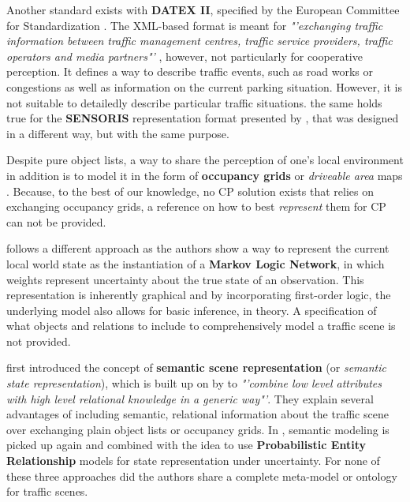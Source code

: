 Another standard exists with \textbf{DATEX II}, specified by the European Committee for Standardization \cite{Dolger2011}. The XML-based format is meant for \textit{"'exchanging traffic information between traffic management centres, traffic service providers, traffic operators and media partners"'} \cite{wiki:datex2}, however, not particularly for cooperative perception. It defines a way to describe traffic events, such as road works or congestions as well as information on the current parking situation. However, it is not suitable to detailedly describe particular traffic situations. the same holds true for the \textbf{SENSORIS} representation format presented by \cite{Hohm2019}, that was designed in a different way, but with the same purpose.

Despite pure object lists, a way to share the perception of one's local environment in addition is to model it in the form of \textbf{occupancy grids} or \textit{driveable area} maps \cite{pieringermodellierung}. Because, to the best of our knowledge, no CP solution exists that relies on exchanging occupancy grids, a reference on how to best \textit{represent} them for CP can not be provided.

\cite{Stiller2012} follows a different approach as the authors show a way to represent the current local world state as the instantiation of a \textbf{Markov Logic Network}, in which weights represent uncertainty about the true state of an observation. This representation is inherently graphical and by incorporating first-order logic, the underlying model also allows for basic inference, in theory. A specification of what objects and relations to include to comprehensively model a traffic scene is not provided.

\cite{Kohlhaas2014} first introduced the concept of \textbf{semantic scene representation} (or \textit{semantic state representation}), which is built up on by \cite{Wolf2018} to \textit{"'combine low level attributes with high level relational knowledge in a generic way"'}. They explain several advantages of including semantic, relational information about the traffic scene over exchanging plain object lists or occupancy grids. In \cite{Petrich2018}, semantic modeling is picked up again and combined with the idea to use \textbf{Probabilistic Entity Relationship} models for state representation under uncertainty. For none of these three approaches did the authors share a complete meta-model or ontology for traffic scenes.
\par
\bigskip

